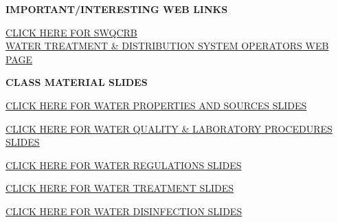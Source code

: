 \documentclass{article}
\begin{document}
 
\textbf{IMPORTANT/INTERESTING WEB LINKS}
\begin{tcolorbox}[width=17cm,box align=center, halign=center,  valign=center,colback={my-blue},title={}, colbacktitle=yellow,coltitle=blue]    
\href{https://www.waterboards.ca.gov/drinking_water/certlic/occupations/DWopcert.html}{CLICK HERE FOR SWQCRB\\ WATER TREATMENT \& DISTRIBUTION SYSTEM OPERATORS WEB PAGE}
\end{tcolorbox} 

%
%

\textbf{CLASS MATERIAL SLIDES}

\begin{tcolorbox}[width=17cm,box align=center, halign=center,  valign=center,colback={my-blue},title={}, colbacktitle=yellow,coltitle=blue]    
\href{https://sbasrai.github.io/Water_Properties_Sources/}{CLICK HERE FOR WATER PROPERTIES AND SOURCES SLIDES}
\end{tcolorbox} 

\begin{tcolorbox}[width=17cm,box align=center, halign=center,  valign=center,colback={my-blue},title={}, colbacktitle=yellow,coltitle=blue]    
\href{https://sbasrai.github.io/Water_Quality_Laboratory_Procedures/}{CLICK HERE FOR WATER QUALITY \& LABORATORY PROCEDURES SLIDES}
\end{tcolorbox} 
%
\begin{tcolorbox}[width=17cm,box align=center, halign=center,  valign=center,colback={my-blue},title={}, colbacktitle=yellow,coltitle=blue]    
\href{https://sbasrai.github.io/WaterRegulations/}{CLICK HERE FOR WATER REGULATIONS SLIDES}
\end{tcolorbox} 
%
\begin{tcolorbox}[width=17cm,box align=center, halign=center,  valign=center,colback={my-blue},title={}, colbacktitle=yellow,coltitle=blue]    
\href{https://sbasrai.github.io/WaterTreatment/}{CLICK HERE FOR WATER TREATMENT SLIDES}
\end{tcolorbox} 
%
\begin{tcolorbox}[width=17cm,box align=center, halign=center,  valign=center,colback={my-blue},title={}, colbacktitle=yellow,coltitle=blue]    
\href{https://sbasrai.github.io/WaterDisinfection/}{CLICK HERE FOR WATER DISINFECTION SLIDES}
\end{tcolorbox} 
%
\end{document}
